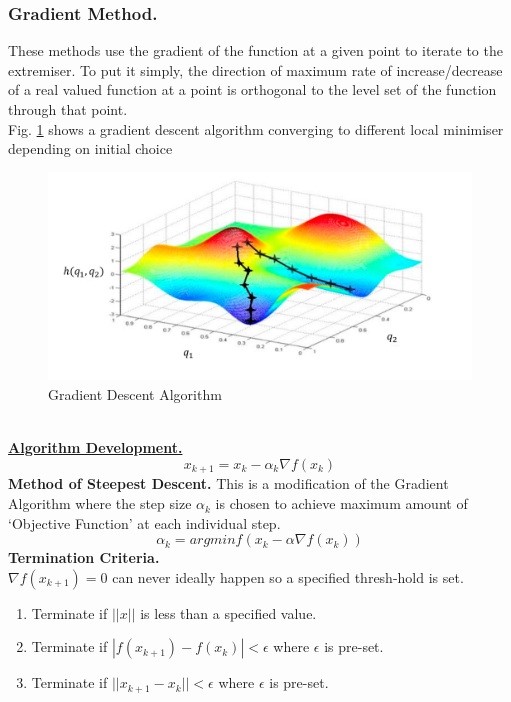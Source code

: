 \documentclass[12pt,a4paper,titlepage]{article}
\begin{document}
\subsubsection{Gradient Method.}
These methods use the gradient of the function at a given point to iterate to the extremiser. To put it simply, the direction of maximum rate of increase/decrease of a real valued function at a point is orthogonal to the level set of the function through that point. \\
Fig. \ref{fig2} shows a gradient descent algorithm converging to different local minimiser depending on initial choice 
\begin{figure}[h!tb]
	\centering
	\includegraphics[scale=0.4]{gradientdescentimg.png}
	\caption{Gradient Descent Algorithm} \label{fig2}
\end{figure}
\\
\textbf{\underline{Algorithm Development.}}
\begin{equation}
    x_{k+1}= x_{k}- \alpha_{k} \nabla f(x_{k})
\end{equation}
\textbf{Method of Steepest Descent.}
This is a modification of the Gradient Algorithm where the step size $ \alpha_{k} $ is chosen to achieve maximum amount of `Objective Function' at each individual step.
\begin{equation}
    \alpha_{k}= argmin f(x_{k}-\alpha \nabla f(x_{k}))
\end{equation}
\textbf{Termination Criteria.} \\
\textbf{$\nabla f(x_{k+1})=0$} can never ideally happen so a specified thresh-hold is set. 
\begin{enumerate}
    \item Terminate if $||x||$ is less than a specified  value.
    \item Terminate if $|f(x_{k+1})- f(x_{k})| < \epsilon $ where $\epsilon$ is pre-set.
    \item Terminate if $ ||x_{k+1}-x_{k}|| < \epsilon $ where $\epsilon$ is pre-set.
\end{enumerate}
\end{document}
